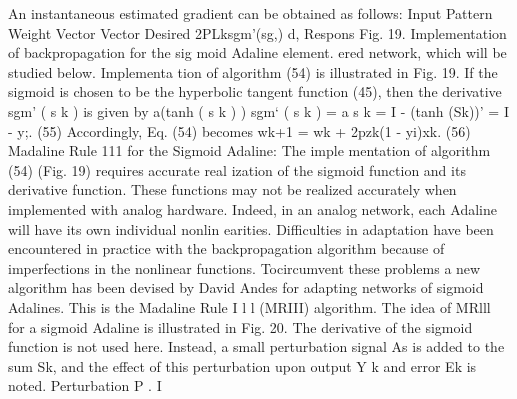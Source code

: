 \documentclass[11pt,a4paper,twocolumn]{article}
\begin{document}
{\newpage


An instantaneous estimated gradient can be obtained as 
follows: 
Input Pattern 
Weight Vector 
Vector 
Desired 
2PLksgm’(sg,) 
d, Respons 
Fig. 19. Implementation of backpropagation for the sig
moid Adaline element. 
ered network, which will be studied below. Implementa
tion of algorithm (54) is illustrated in Fig. 19. 
If the sigmoid is chosen to be the hyperbolic tangent 
function (45), then the derivative sgm’ ( s k )  is given by 
a(tanh ( s k ) )  
sgm‘ ( s k )  = 
a s k  
= I - (tanh (Sk))’ = I - y;. 
(55) 
Accordingly, Eq. (54) becomes 
wk+1 = wk + 2pzk(1 - yi)xk. 
(56) 
Madaline Rule 111 for the Sigmoid Adaline: The imple
mentation of algorithm (54) (Fig. 19) requires accurate real
ization of the sigmoid function and its derivative function. 
These functions may not be realized accurately when 
implemented with analog hardware. Indeed, in an analog 
network, each Adaline will have its own individual nonlin
earities. Difficulties in adaptation have been encountered 
in practice with the backpropagation algorithm because of 
imperfections in the nonlinear functions. 
Tocircumvent these problems a new algorithm has been 
devised by David Andes for adapting networks of sigmoid 
Adalines. This is the Madaline Rule I l l  (MRIII) algorithm. 
The idea of MRlll for a sigmoid Adaline is illustrated in 
Fig. 20. The derivative of the sigmoid function is not used 
here. Instead, a small perturbation signal As is added to the 
sum Sk, and the effect of this perturbation upon output Y k  
and error Ek is noted. 
Perturbation 
P 
.
I

}
\end{document}
